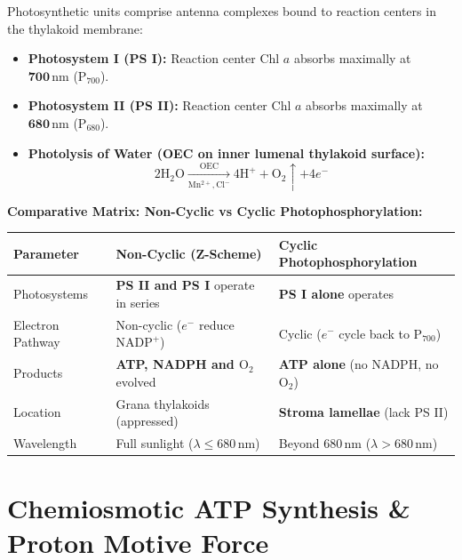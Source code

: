 \documentclass[10pt,twoside,openright]{book}
\begin{document}
\begin{formulabox}
Photosynthetic units comprise antenna complexes bound to reaction centers in the thylakoid membrane:
\begin{itemize}[leftmargin=*]
  \item \textbf{Photosystem I (PS I):} Reaction center Chl $a$ absorbs maximally at $\mathbf{700\,\mathrm{nm}}$ ($\mathrm{P_{700}}$).
  \item \textbf{Photosystem II (PS II):} Reaction center Chl $a$ absorbs maximally at $\mathbf{680\,\mathrm{nm}}$ ($\mathrm{P_{680}}$).
  \item \textbf{Photolysis of Water (OEC on inner lumenal thylakoid surface):}
  \[
    2\mathrm{H_2O} \xrightarrow[\mathrm{Mn^{2+}, Cl^-}]{\text{OEC}} 4\mathrm{H}^+ + \mathrm{O}_2 \uparrow + 4e^-
  \]
\end{itemize}

\textbf{Comparative Matrix: Non-Cyclic vs Cyclic Photophosphorylation:}
\begin{center}
\footnotesize
\setlength{\tabcolsep}{3pt}
\renewcommand{\arraystretch}{1.2}
\begin{tabularx}{\linewidth}{|l|X|X|}
\hline
\textbf{Parameter} & \textbf{Non-Cyclic (Z-Scheme)} & \textbf{Cyclic Photophosphorylation} \\
\hline
Photosystems & \textbf{PS II and PS I} operate in series & \textbf{PS I alone} operates \\
Electron Pathway & Non-cyclic ($e^-$ reduce $\mathrm{NADP}^+$) & Cyclic ($e^-$ cycle back to $\mathrm{P_{700}}$) \\
Products & \textbf{ATP, NADPH and $\mathrm{O}_2$} evolved & \textbf{ATP alone} (no NADPH, no $\mathrm{O}_2$) \\
Location & Grana thylakoids (appressed) & \textbf{Stroma lamellae} (lack PS II) \\
Wavelength & Full sunlight ($\lambda \le 680\,\mathrm{nm}$) & Beyond $680\,\mathrm{nm}$ ($\lambda > 680\,\mathrm{nm}$) \\
\hline
\end{tabularx}
\end{center}
\end{formulabox}

\section{Chemiosmotic ATP Synthesis \& Proton Motive Force}
\end{document}
